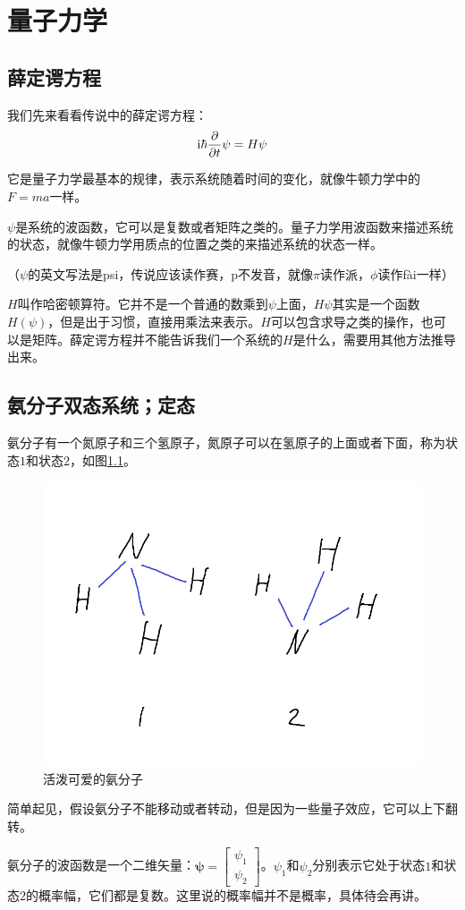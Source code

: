 \chapter{量子力学}
\section{薛定谔方程}
我们先来看看传说中的薛定谔方程：
\begin{equation*}
\mathrm{i} \hbar \frac{\partial}{\partial t} \psi=H \psi
\end{equation*}

它是量子力学最基本的规律，表示系统随着时间的变化，就像牛顿力学中的$F=m a$一样。

$\psi$是系统的波函数，它可以是复数或者矩阵之类的。量子力学用波函数来描述系统的状态，就像牛顿力学用质点的位置之类的来描述系统的状态一样。

（$\psi$的英文写法是psi，传说应该读作赛，p不发音，就像$\pi$读作派，$\phi$读作fài一样）

$H$叫作哈密顿算符。它并不是一个普通的数乘到$\psi$上面，$H \psi$其实是一个函数$H(\psi)$，但是出于习惯，直接用乘法来表示。$H$可以包含求导之类的操作，也可以是矩阵。薛定谔方程并不能告诉我们一个系统的$H$是什么，需要用其他方法推导出来。
\section{氨分子双态系统；定态}
氨分子有一个氮原子和三个氢原子，氮原子可以在氢原子的上面或者下面，称为状态$1$和状态$2$，如图\ref{fig-ammonia}。
\begin{figure}[htb]
\centering
\includegraphics[width=0.33\linewidth]{fig/ammonia.png}
\caption{活泼可爱的氨分子}
\label{fig-ammonia}
\end{figure}

简单起见，假设氨分子不能移动或者转动，但是因为一些量子效应，它可以上下翻转。

氨分子的波函数是一个二维矢量：$\mathbf{\psi}=\begin{bmatrix} \psi_1 \\ \psi_2 \end{bmatrix}$。$\psi_1$和$\psi_2$分别表示它处于状态$1$和状态$2$的概率幅，它们都是复数。这里说的概率幅并不是概率，具体待会再讲。

